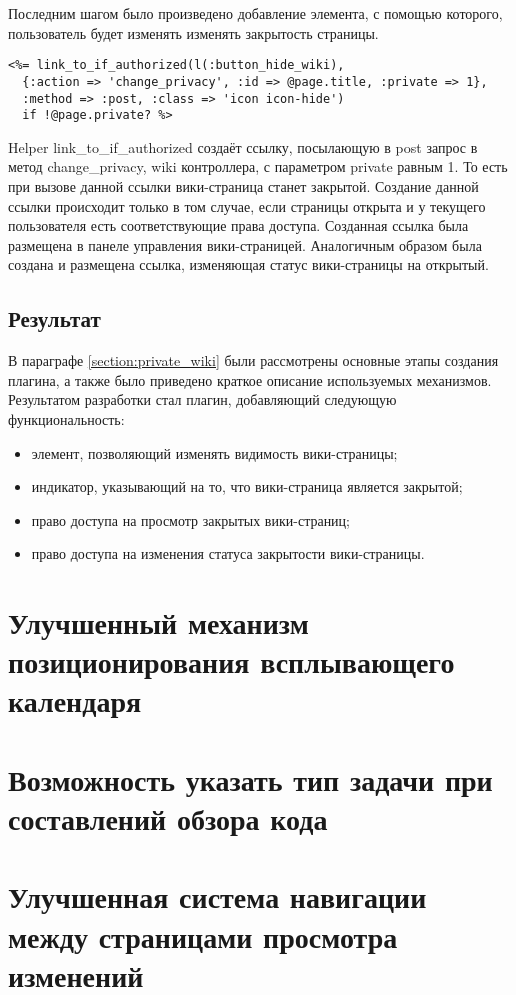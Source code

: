 Последним шагом было произведено добавление элемента, с помощью которого,
пользователь будет изменять изменять закрытость страницы.
\small{\begin{lstlisting}
<%= link_to_if_authorized(l(:button_hide_wiki), 
  {:action => 'change_privacy', :id => @page.title, :private => 1}, 
  :method => :post, :class => 'icon icon-hide') 
  if !@page.private? %>
\end{lstlisting}}
Helper link\_to\_if\_authorized создаёт ссылку, посылающую в post запрос в
метод change\_privacy, wiki контроллера, с параметром private равным 1. То есть при
вызове данной ссылки вики-страница станет закрытой. Создание данной ссылки
происходит только в том случае, если страницы открыта и у текущего пользователя
есть соответствующие права доступа. Созданная ссылка была размещена в панеле
управления вики-страницей. Аналогичным образом была создана и размещена
ссылка, изменяющая статус вики-страницы на открытый.

\subsection{Результат}
В параграфе \ref{section:private_wiki} были рассмотрены основные этапы создания
плагина, а также было приведено краткое описание используемых механизмов.
Результатом разработки стал плагин, добавляющий следующую функциональность:
\begin{itemize}
  \item элемент, позволяющий изменять видимость вики-страницы;
  \item индикатор, указывающий на то, что вики-страница является закрытой;
  \item право доступа на просмотр закрытых вики-страниц;
  \item право доступа на изменения статуса закрытости вики-страницы.
\end{itemize}



\section{Улучшенный механизм позиционирования всплывающего календаря}

\section{Возможность указать тип задачи при составлений обзора кода}

\section{Улучшенная система навигации между страницами просмотра изменений}

